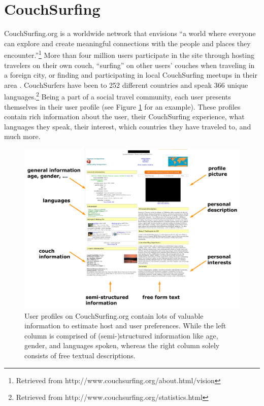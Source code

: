 \section{CouchSurfing}

CouchSurfing.org is a worldwide network that envisions ``a world where everyone can explore and create meaningful connections with the people and places they encounter.''\footnote{Retrieved from http://www.couchsurfing.org/about.html/vision}
More than four million users participate in the site through hosting travelers on their own couch, ``surfing'' on other users' couches when traveling in a foreign city, or finding and participating in local CouchSurfing meetups in their area \cite{lauterbach2009surfing}. CouchSurfers have been to 252 different countries and speak 366 unique languages.\footnote{Retrieved from http://www.couchsurfing.org/statistics.html}
Being a part of a social travel community, each user presents themselves in their user profile (see Figure \ref{fig:csprofile} for an example). These profiles contain rich information about the user, their CouchSurfing experience, what languages they speak, their interest, which countries they have traveled to, and much more.


\begin{figure}[ht]
\centering
\includegraphics[width=1\linewidth]{figures/csprofile.pdf}
\caption{User profiles on CouchSurfing.org contain lots of valuable information to estimate host and user preferences. While the left column is comprised of (semi-)structured information like age, gender, and languages spoken, whereas the right column solely consists of free textual descriptions.}
\label{fig:csprofile}
\end{figure}

